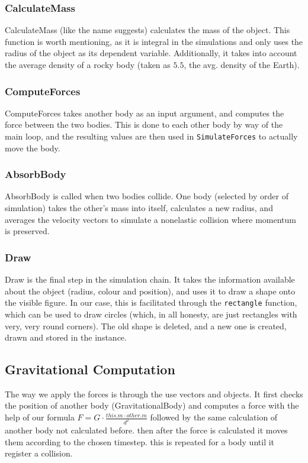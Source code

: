 \documentclass[11pt]{article}
\begin{document}
\subsubsection{CalculateMass}
CalculateMass (like the name suggests) calculates the mass of the object. This function is worth mentioning, as it is integral in the simulations and only uses the radius of the object as its dependent variable. Additionally, it takes into account the average density of a rocky body (taken as $5.5$, the avg. density of the Earth).
\subsubsection{ComputeForces}
ComputeForces takes another body as an input argument, and computes the force between the two bodies. This is done to each other body by way of the main loop, and the resulting values are then used in \verb|SimulateForces| to actually move the body.
\subsubsection{AbsorbBody}
AbsorbBody is called when two bodies collide. One body (selected by order of simulation) takes the other's mass into itself, calculates a new radius, and averages the velocity vectors to simulate a nonelastic collision where momentum is preserved.
\subsubsection{Draw}
Draw is the final step in the simulation chain. It takes the information available about the object (radius, colour and position), and uses it to draw a shape onto the visible figure. In our case, this is facilitated through the \verb|rectangle| function, which can be used to draw circles (which, in all honesty, are just rectangles with very, very round corners). The old shape is deleted, and a new one is created, drawn and stored in the instance.

\subsection{Gravitational Computation}\label{gravityComputeInfo}
The way we apply the forces is through the use vectors and objects. It first checks the position of another body (GravitationalBody) and computes a force with the help of our formula $F = G \cdot \frac{this.m \cdot other.m}{d^{2}}$ followed by the same calculation of another body not calculated before. then after the force is calculated it moves them according to the chosen timestep. this is repeated for a body until it register a collision.
\end{document}
